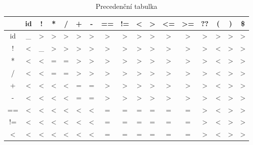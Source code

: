 \begin{table}[p]
\centering
\caption{Precedenční tabulka}
\begin{tabular}{c|cccccccccccccccc}
\toprule
 & id & ! & * & / & + & - & == & != & \textless{} & \textgreater{} & \textless{}= & \textgreater{}= & ?? & ( & ) & \$ \\
\midrule
id & \_ & \textgreater{} & \textgreater{} & \textgreater{} & \textgreater{} & \textgreater{} & \textgreater{} & \textgreater{} & \textgreater{} & \textgreater{} & \textgreater{} & \textgreater{} & \textgreater{} & \textgreater{} & \textgreater{} & \textgreater{} \\
! & \textless{} & \_ & \textgreater{} & \textgreater{} & \textgreater{} & \textgreater{} & \textgreater{} & \textgreater{} & \textgreater{} & \textgreater{} & \textgreater{} & \textgreater{} & \textgreater{} & \textless{} & \textgreater{} & \textgreater{} \\
* & \textless{} & \textless{} & = & = & \textgreater{} & \textgreater{} & \textgreater{} & \textgreater{} & \textgreater{} & \textgreater{} & \textgreater{} & \textgreater{} & \textgreater{} & \textless{} & \textgreater{} & \textgreater{} \\
/ & \textless{} & \textless{} & = & = & \textgreater{} & \textgreater{} & \textgreater{} & \textgreater{} & \textgreater{} & \textgreater{} & \textgreater{} & \textgreater{} & \textgreater{} & \textless{} & \textgreater{} & \textgreater{} \\
+ & \textless{} & \textless{} & \textless{} & \textless{} & = & = & \textgreater{} & \textgreater{} & \textgreater{} & \textgreater{} & \textgreater{} & \textgreater{} & \textgreater{} & \textless{} & \textgreater{} & \textgreater{} \\
- & \textless{} & \textless{} & \textless{} & \textless{} & = & = & \textgreater{} & \textgreater{} & \textgreater{} & \textgreater{} & \textgreater{} & \textgreater{} & \textgreater{} & \textless{} & \textgreater{} & \textgreater{} \\
== & \textless{} & \textless{} & \textless{} & \textless{} & \textless{} & \textless{} & = & = & = & = & = & = & \textgreater{} & \textless{} & \textgreater{} & \textgreater{} \\
!= & \textless{} & \textless{} & \textless{} & \textless{} & \textless{} & \textless{} & = & = & = & = & = & = & \textgreater{} & \textless{} & \textgreater{} & \textgreater{} \\
\textless{} & \textless{} & \textless{} & \textless{} & \textless{} & \textless{} & \textless{} & = & = & = & = & = & = & \textgreater{} & \textless{} & \textgreater{} & \textgreater{} \\

\end{tabular}
\end{table}
